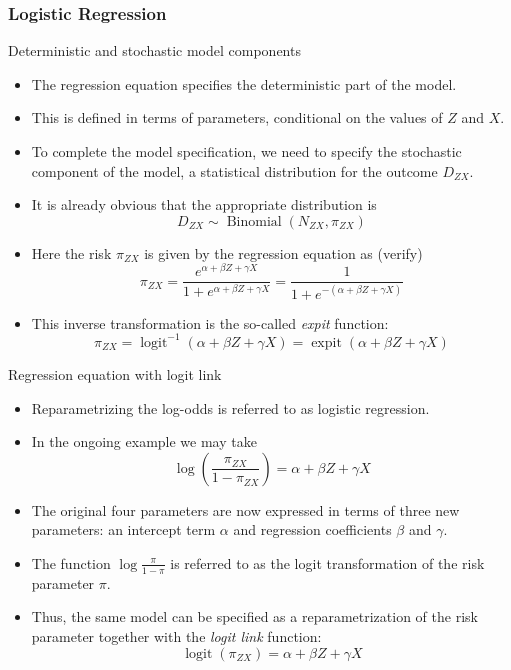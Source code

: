 \documentclass[10pt]{beamer}\usepackage[]{graphicx}\usepackage[]{color}
\begin{document}
\subsubsection{Logistic Regression}

\begin{frame}{Deterministic and stochastic model components}
	\begin{itemize}
		\item 
		The regression equation specifies the deterministic part of the model.
		
		\item This is defined in terms of parameters, conditional on the values of $Z$ and $X$.
		
		\item To complete the model specification, we need to specify the stochastic component of the model, a statistical distribution for the outcome $D_{Z X}$. 
		\item It is already obvious that the appropriate distribution is
		$$
		D_{Z X} \sim \operatorname{Binomial}\left(N_{Z X}, \pi_{Z X}\right)
		$$
		\item Here the risk $\pi_{Z X}$ is given by the regression equation as (verify)
		$$
		\pi_{Z X}=\frac{e^{\alpha+\beta Z+\gamma X}}{1+e^{\alpha+\beta Z+\gamma X}}=\frac{1}{1+e^{-(\alpha+\beta Z+\gamma X)}}
		$$
		\item This inverse transformation is the so-called \textit{expit} function:
		$$
		\pi_{Z X}=\operatorname{logit}^{-1}(\alpha+\beta Z+\gamma X)=\operatorname{expit}(\alpha+\beta Z+\gamma X)
		$$
	\end{itemize}
\end{frame}

\begin{frame}{Regression equation with logit link}
	\begin{itemize}
		\item Reparametrizing the log-odds is referred to as logistic regression.
		\item In the ongoing example we may take
		$$
		\log \left(\frac{\pi_{Z X}}{1-\pi_{Z X}}\right)=\alpha+\beta Z+\gamma X
		$$
		\item The original four parameters are now expressed in terms of three new parameters: an intercept term $\alpha$ and regression coefficients $\beta$ and $\gamma$.
		\item The function $\log \frac{\pi}{1-\pi}$ is referred to as the logit transformation of the risk parameter $\pi$.
		\item Thus, the same model can be specified as a reparametrization of the risk parameter together with the \textit{logit link} function:
		$$
		\operatorname{logit}\left(\pi_{Z X}\right)=\alpha+\beta Z+\gamma X
		$$
	\end{itemize}
\end{frame}
\end{document}
